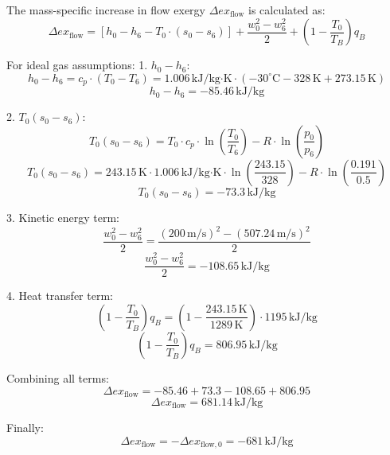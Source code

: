 The mass-specific increase in flow exergy \( \Delta ex_{\text{flow}} \) is calculated as:  
\[
\Delta ex_{\text{flow}} = [h_0 - h_6 - T_0 \cdot (s_0 - s_6)] + \frac{w_0^2 - w_6^2}{2} + \left(1 - \frac{T_0}{T_B}\right) q_B
\]  

For ideal gas assumptions:  
1. \( h_0 - h_6 \):  
\[
h_0 - h_6 = c_p \cdot (T_0 - T_6) = 1.006 \, \text{kJ/kg·K} \cdot (-30^\circ\text{C} - 328 \, \text{K} + 273.15 \, \text{K})
\]  
\[
h_0 - h_6 = -85.46 \, \text{kJ/kg}
\]  

2. \( T_0 (s_0 - s_6) \):  
\[
T_0 (s_0 - s_6) = T_0 \cdot c_p \cdot \ln\left(\frac{T_0}{T_6}\right) - R \cdot \ln\left(\frac{p_0}{p_6}\right)
\]  
\[
T_0 (s_0 - s_6) = 243.15 \, \text{K} \cdot 1.006 \, \text{kJ/kg·K} \cdot \ln\left(\frac{243.15}{328}\right) - R \cdot \ln\left(\frac{0.191}{0.5}\right)
\]  
\[
T_0 (s_0 - s_6) = -73.3 \, \text{kJ/kg}
\]  

3. Kinetic energy term:  
\[
\frac{w_0^2 - w_6^2}{2} = \frac{(200 \, \text{m/s})^2 - (507.24 \, \text{m/s})^2}{2}
\]  
\[
\frac{w_0^2 - w_6^2}{2} = -108.65 \, \text{kJ/kg}
\]  

4. Heat transfer term:  
\[
\left(1 - \frac{T_0}{T_B}\right) q_B = \left(1 - \frac{243.15 \, \text{K}}{1289 \, \text{K}}\right) \cdot 1195 \, \text{kJ/kg}
\]  
\[
\left(1 - \frac{T_0}{T_B}\right) q_B = 806.95 \, \text{kJ/kg}
\]  

Combining all terms:  
\[
\Delta ex_{\text{flow}} = -85.46 + 73.3 - 108.65 + 806.95
\]  
\[
\Delta ex_{\text{flow}} = 681.14 \, \text{kJ/kg}
\]  

Finally:  
\[
\Delta ex_{\text{flow}} = -\Delta ex_{\text{flow},0} = -681 \, \text{kJ/kg}
\]